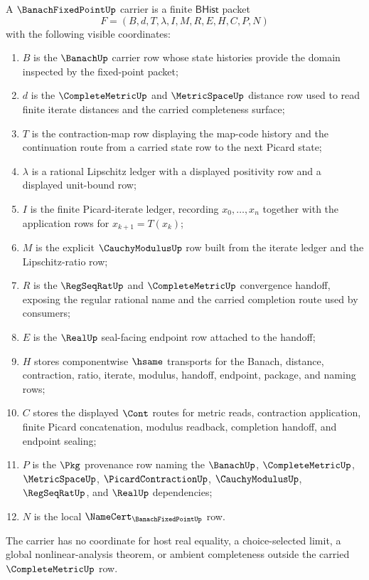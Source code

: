 \begin{definition}
\label{def:banach-fixed-point-carrier}
A $\BanachFixedPointUp$ carrier is a finite $\mathsf{BHist}$ packet
$$
F=(B,d,T,\lambda,I,M,R,E,H,C,P,N)
$$
with the following visible coordinates:
\begin{enumerate}
\item $B$ is the $\BanachUp$ carrier row whose state histories provide the domain inspected by the fixed-point packet;
\item $d$ is the $\CompleteMetricUp$ and $\MetricSpaceUp$ distance row used to read finite iterate distances and the carried completeness surface;
\item $T$ is the contraction-map row displaying the map-code history and the continuation route from a carried state row to the next Picard state;
\item $\lambda$ is a rational Lipschitz ledger with a displayed positivity row and a displayed unit-bound row;
\item $I$ is the finite Picard-iterate ledger, recording $x_0,\ldots,x_n$ together with the application rows for $x_{k+1}=T(x_k)$;
\item $M$ is the explicit $\CauchyModulusUp$ row built from the iterate ledger and the Lipschitz-ratio row;
\item $R$ is the $\RegSeqRatUp$ and $\CompleteMetricUp$ convergence handoff, exposing the regular rational name and the carried completion route used by consumers;
\item $E$ is the $\RealUp$ seal-facing endpoint row attached to the handoff;
\item $H$ stores componentwise $\hsame$ transports for the Banach, distance, contraction, ratio, iterate, modulus, handoff, endpoint, package, and naming rows;
\item $C$ stores the displayed $\Cont$ routes for metric reads, contraction application, finite Picard concatenation, modulus readback, completion handoff, and endpoint sealing;
\item $P$ is the $\Pkg$ provenance row naming the $\BanachUp$, $\CompleteMetricUp$, $\MetricSpaceUp$, $\PicardContractionUp$, $\CauchyModulusUp$, $\RegSeqRatUp$, and $\RealUp$ dependencies;
\item $N$ is the local $\NameCert_{\BanachFixedPointUp}$ row.
\end{enumerate}
The carrier has no coordinate for host real equality, a choice-selected limit, a global nonlinear-analysis theorem, or ambient completeness outside the carried $\CompleteMetricUp$ row.
\end{definition}

